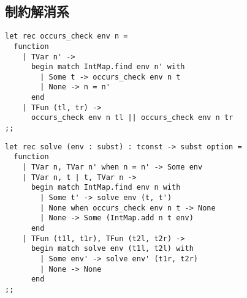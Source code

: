 \subsection{制約解消系}

\begin{lstlisting}[caption=出現検査, label=list:ocaml-stlc-occurs-check]
let rec occurs_check env n =
  function
    | TVar n' ->
      begin match IntMap.find env n' with
        | Some t -> occurs_check env n t
        | None -> n = n'
      end
    | TFun (tl, tr) ->
      occurs_check env n tl || occurs_check env n tr
;;
\end{lstlisting}

\begin{lstlisting}[caption=方程式を解く関数, label=list:ocaml-stlc-solve]
let rec solve (env : subst) : tconst -> subst option =
  function
    | TVar n, TVar n' when n = n' -> Some env
    | TVar n, t | t, TVar n ->
      begin match IntMap.find env n with
        | Some t' -> solve env (t, t')
        | None when occurs_check env n t -> None
        | None -> Some (IntMap.add n t env)
      end
    | TFun (t1l, t1r), TFun (t2l, t2r) ->
      begin match solve env (t1l, t2l) with
        | Some env' -> solve env' (t1r, t2r)
        | None -> None
      end
;;
\end{lstlisting}

